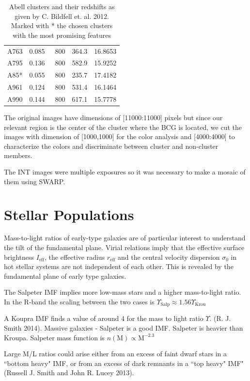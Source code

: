 \begin{table}[]
\begin{tabular}{ccccc}
A763    & 0.085 & ~800           & 364.3 & 16.8653   \\
A795    & 0.136 & ~800           & 582.9 & 15.9252   \\
A85*    & 0.055 & ~800           & 235.7 & 17.4182   \\
A961    & 0.124 & ~800           & 531.4 & 16.1464   \\
A990    & 0.144 & ~800           & 617.1 & 15.7778   
\end{tabular}
\caption[Abell Clusters and their redshift]{Abell clusters and their redshifts as given by C. Bildfell et. al. 2012. Marked with * the chosen clusters with the most promising features}
\end{table}

The original images have dimensions of [11000:11000] pixels but since our relevant region is the center of the cluster where the BCG is located, we cut the images with dimension of [1000,1000] for the color analysis and [4000:4000] to characterize the colors and discriminate between cluster and non-cluster members.

The INT images were multiple exposures so it was necessary to make a mosaic of them using SWARP.


\section{Stellar Populations}

Mass-to-light ratios of early-type galaxies are of particular interest to understand the tilt of the fundamental plane. Virial relations imply that the effective surface brightness $I_{\text{eff}}$, the effective radius $r_{\text{eff}}$ and the central velocity dispersion $\sigma_{0}$ in hot stellar systems are not independent of each other. This is revealed by the fundamental plane of early type galaxies.

The Salpeter IMF implies more low-mass stars and a higher mass-to-light ratio. In the R-band the scaling between the two cases is $\Upsilon_{\text{Salp}}\approx 1.56\Upsilon_{\text{Krou}}$

A Koupra IMF finds a value of around 4 for the mass to light ratio $\Upsilon$. (R. J. Smith 2014). Massive galaxies - Salpeter is a good IMF. Salpeter is heavier than Kroupa. Salpeter mass function is $n(\textrm{M})\propto \textrm{M}^{-2.3}$ 

Large M/L ratios could arise either from an excess of faint dwarf stars in a ``bottom heavy" IMF, or from an excess of dark remnants in a ``top heavy" IMF" (Russell J. Smith and John R. Lucey 2013).


